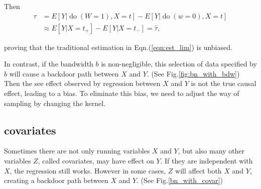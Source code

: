 \documentclass[a4 paper,12pt]{article}
\DeclareMathOperator{\Do}{do}
\begin{document}
Then
\begin{align}
   \tau&=E[Y|\Do(W=1),X=t]-E[Y|\Do(w=0),X=t]\\
   &\approx E[Y|X=t_+]-E[Y|X=t_-]=\hat\tau,
\end{align}

\noindent proving that the traditional estimation in Eqn.(\ref{eqn:est_lim}) is unbiased.

In contrast, if the bandwidth $b$ is non-negligible, this selection of data specified by $b$ will cause a backdoor path between $X$ and $Y$. (See Fig.\ref{fig:bn_with_bdw}) Then the see effect observed by regression between $X$ and $Y$ is not the true causal effect, leading to a bias. To eliminate this bias, we need to adjust the way of sampling by changing the kernel.

\subsection*{covariates}
Sometimes there are not only running variables $X$ and $Y$, but also many other variables $Z$, called covariates, may have effect on $Y$. If they are independent with $X$, the regression still works. However in some cases, $Z$ will affect both $X$ and $Y$, creating a backdoor path between $X$ and $Y$. (See Fig.\ref{bn_with_covar})
\end{document}
